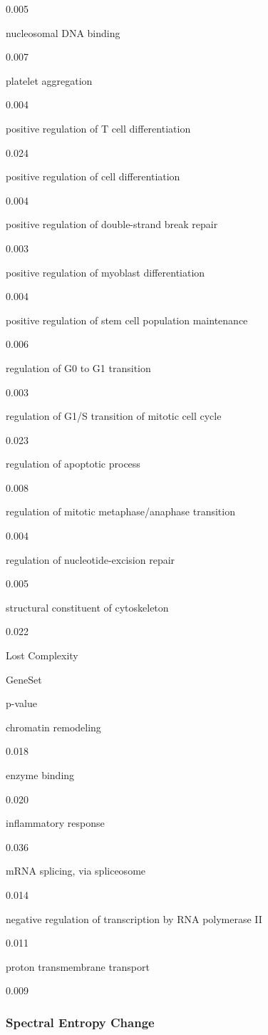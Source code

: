 \documentclass[
  letterpaper,
  DIV=11,
  numbers=noendperiod,
  openany,
  oneside]{scrreprt}
\begin{document}
0.005

nucleosomal DNA binding

0.007

platelet aggregation

0.004

positive regulation of T cell differentiation

0.024

positive regulation of cell differentiation

0.004

positive regulation of double-strand break repair

0.003

positive regulation of myoblast differentiation

0.004

positive regulation of stem cell population maintenance

0.006

regulation of G0 to G1 transition

0.003

regulation of G1/S transition of mitotic cell cycle

0.023

regulation of apoptotic process

0.008

regulation of mitotic metaphase/anaphase transition

0.004

regulation of nucleotide-excision repair

0.005

structural constituent of cytoskeleton

0.022

Lost Complexity

GeneSet

p-value

chromatin remodeling

0.018

enzyme binding

0.020

inflammatory response

0.036

mRNA splicing, via spliceosome

0.014

negative regulation of transcription by RNA polymerase II

0.011

proton transmembrane transport

0.009

\subsubsection{Spectral Entropy Change}
\end{document}
